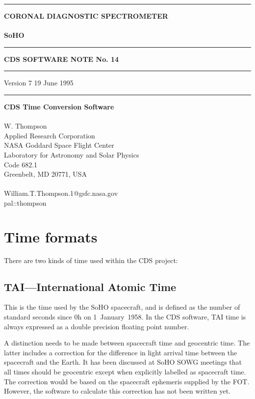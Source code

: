 \begin{titlepage}
\hrule
{\noindent\bf CORONAL DIAGNOSTIC SPECTROMETER}\\
\vspace{-0.7\baselineskip}\\
{\noindent\Huge\bf SoHO}
\vspace{2mm}
\hrule
\vspace{3mm}
\centerline{\bf CDS SOFTWARE NOTE No. 14}
\vspace{3mm}
\hrule
\noindent Version 7 \hfill 19 June 1995
\vspace{2mm}
\hrule

\begin{centerpage}

\begin{center}
{\Large\bf CDS Time Conversion Software}\\
\mbox{}\\
W. Thompson\\
Applied Research Corporation\\
NASA Goddard Space Flight Center\\
Laboratory for Astronomy and Solar Physics\\
Code 682.1\\
Greenbelt, MD 20771, USA\\
\mbox{}\\
William.T.Thompson.1@gsfc.nasa.gov\\
pal::thompson
\end{center}

\end{centerpage}

\end{titlepage}

\section{Time formats}

There are two kinds of time used within the CDS project:

\subsection{TAI---International Atomic Time}

This is the time used by the SoHO spacecraft, and is defined as the number of
standard seconds since 0h on 1~January~1958.  In the CDS software, TAI time is
always expressed as a double precision floating point number.

A distinction needs to be made between spacecraft time and geocentric time.
The latter includes a correction for the difference in light arrival time
between the spacecraft and the Earth.  It has been discussed at SoHO SOWG
meetings that all times should be geocentric except when explicitly labelled as
spacecraft time.  The correction would be based on the spacecraft ephemeris
supplied by the FOT.  However, the software to calculate this correction has
not been written yet.

